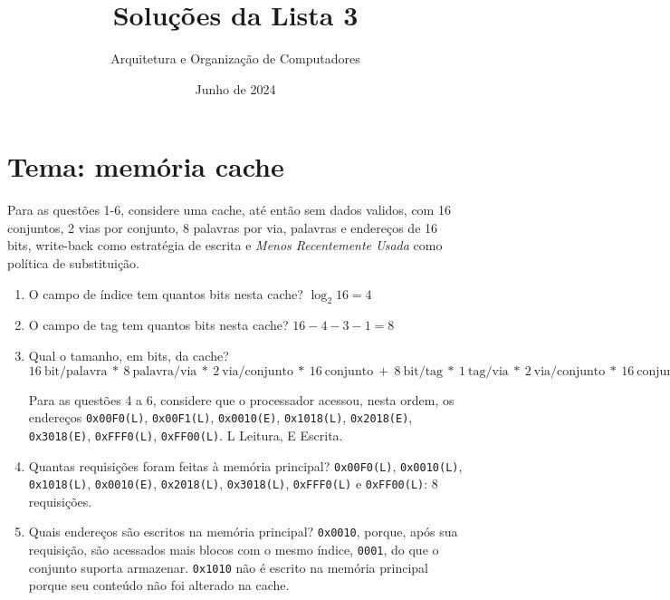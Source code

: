 \documentclass{article}
\title{\Huge Soluções da Lista 3}
\author{\Large Arquitetura e Organização de Computadores}
\date{Junho de 2024}
\begin{document}
\large

\maketitle

\section*{Tema: memória cache}

Para as questões 1-6, considere uma cache, até então sem dados validos, com 16 conjuntos, 2 vias por conjunto, 8 palavras por via, palavras e endereços de 16 bits, write-back como estratégia de escrita e \textit{Menos Recentemente Usada} como política de substituição.

\begin{enumerate}

\item O campo de índice tem quantos bits nesta cache?
$\log_2{16} = 4$

\item O campo de tag tem quantos bits nesta cache?
$16 - 4 - 3 - 1 = 8$

\item Qual o tamanho, em bits, da cache?
$16\ \text{bit/palavra}\ *\ 8\ \text{palavra/via}\ *\ 2\ \text{via/conjunto}\ *\ 16\ \text{conjunto}\ +\ 8\ \text{bit/tag}\ *\ 1\ \text{tag/via}\ *\ 2\ \text{via/conjunto}\ *\ 16\ \text{conjunto}\ +\ 1\ \text{bit\_validade/via}\ *\ 2\ \text{via/conjunto}\ *\ 16\ \text{conjunto}\ +\ 1\ \text{bit\_escrita/via}\ *\ 2\ \text{via/conjunto}\ *\ 16\ \text{conjunto}\ +\ 1\ \text{bit\_uso/conjunto}\ *\ 16\ \text{conjunto}\ =\ 4432\ \text{bits}$

Para as questões 4 a 6, considere que o processador acessou, nesta ordem, os endereços \verb|0x00F0(L)|, \verb|0x00F1(L)|, \verb|0x0010(E)|, \verb|0x1018(L)|, \verb|0x2018(E)|, \verb|0x3018(E)|, \verb|0xFFF0(L)|, \verb|0xFF00(L)|. L \textrightarrow Leitura, E \textrightarrow Escrita.

\item Quantas requisições foram feitas à memória principal? \verb|0x00F0(L)|, \verb|0x0010(L)|, \verb|0x1018(L)|, \verb|0x0010(E)|, \verb|0x2018(L)|, \verb|0x3018(L)|, \verb|0xFFF0(L)| e \verb|0xFF00(L)|: 8 requisições.

\item Quais endereços são escritos na memória principal? \verb|0x0010|, porque, após sua requisição, são acessados mais blocos com o mesmo índice, \verb|0001|, do que o conjunto suporta armazenar. \verb|0x1010| não é escrito na memória principal porque seu conteúdo não foi alterado na cache.


\end{enumerate}
\end{document}
